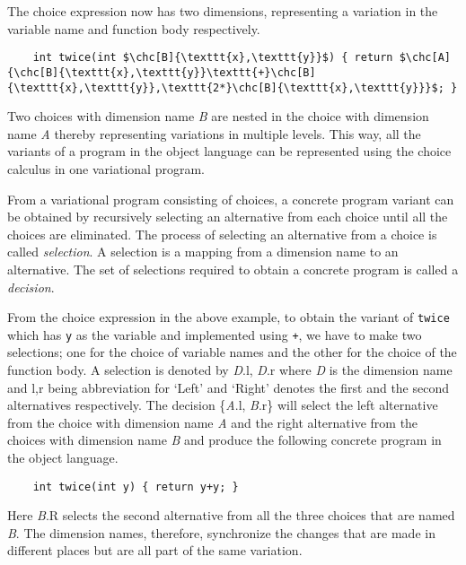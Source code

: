         
The choice expression now has two dimensions, representing a variation in the variable name and function body respectively.%

\begin{lstlisting}  
	int twice(int $\chc[B]{\texttt{x},\texttt{y}}$) { return $\chc[A]{\chc[B]{\texttt{x},\texttt{y}}\texttt{+}\chc[B]{\texttt{x},\texttt{y}},\texttt{2*}\chc[B]{\texttt{x},\texttt{y}}}$; } 
\end{lstlisting}


Two choices with dimension name \textit{B} are nested in the choice with dimension name \textit{A} thereby representing variations in multiple levels. This way, all the variants of a program in the object language can be represented using the choice calculus in one variational program.

From a variational program consisting of choices, a concrete program variant can be obtained by recursively selecting an alternative from each choice until all the choices are eliminated. The process of selecting an alternative from a choice is called \textit{selection}. A selection is a mapping from a dimension name to an alternative. The set of selections required to obtain a concrete program is called a \textit{decision}.

From the choice expression in the above example, to obtain the variant of \texttt{twice} which has \texttt{y} as the variable and implemented using \texttt{+}, we have to make two selections; one for the choice of variable names and the other for the choice of the function body. A selection is denoted by \textit{D}.l, \textit{D}.r where \textit{D} is the dimension name and l,r being abbreviation for `Left' and `Right' denotes the first and the second alternatives respectively.%
The decision \{\textit{A}.l, \textit{B}.r\} will select the left alternative from the choice with dimension name \textit{A} and the right alternative from the choices with dimension name \textit{B} and produce the following concrete program in the object language.

\begin{lstlisting}
	int twice(int y) { return y+y; }
\end{lstlisting}
        
Here \textit{B}.R selects the second alternative from all the three choices that are named \textit{B}. The dimension names, therefore, synchronize the changes that are made in different places but are all part of the same variation. 

